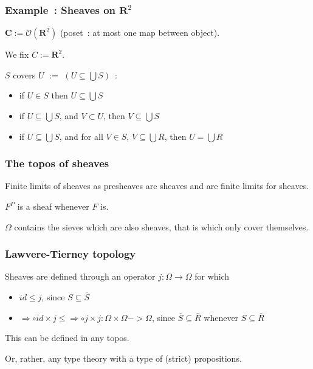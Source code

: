 \documentclass{beamer}
\newcommand{\ovl}{\overline}
\newcommand{\0}{\boldsymbol{0}}
\newcommand{\1}{\boldsymbol{1}}
\begin{document}
\begin{frame}
    \frametitle{Example~: Sheaves on $\mathbf{R}^2$}

    $\textbf{C} := \mathcal{O}(\mathbf{R}^2)$ (poset~: at most one map between object).

    We fix $C := \mathbf{R}^2$.

    $S$ covers $U$ $:=$ $(U \subseteq \bigcup S)$~:
    \begin{itemize}
        \item if $U \in S$ then $U \subseteq \bigcup S$
        \item if $U \subseteq \bigcup S$, and $V \subset U$, then $V \subseteq \bigcup S$
        \item if $U \subseteq \bigcup S$, and for all $V\in S$, $V \subseteq \bigcup R$, then $U = \bigcup R$
    \end{itemize}
\end{frame}

\begin{frame}
    \frametitle{The topos of sheaves}

    Finite limits of sheaves as presheaves are sheaves and are finite limits for sheaves.\vspace{1cm}

    $F^P$ is a sheaf whenever $F$ is.\vspace{1cm}
    
    $\Omega$ contains the sieves which are also sheaves, that is which only cover themselves.
\end{frame}

\begin{frame}
    \frametitle{Lawvere-Tierney topology}
    Sheaves are defined through an operator $j : \Omega \to \Omega$ for which
    \begin{itemize}
        \item $ id \leq j$, since $S\subseteq \ovl S$
        \item $ \Rightarrow \circ id \times j \leq \Rightarrow \circ j \times j : \Omega \times \Omega ->\Omega$, since $\ovl S \subseteq \ovl R$ whenever $S \subseteq \ovl{R}$
    \end{itemize}

    This can be defined in any topos.
    \vspace{0.5cm}

    Or, rather, any type theory with a type of (strict) propositions.
\end{frame}
\end{document}
